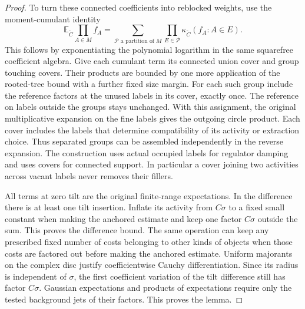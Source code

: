 \documentclass[11pt]{article}
\theoremstyle{definition}
\newcommand{\E}{\mathbb E}
\begin{document}
\begin{proof}
To turn these connected coefficients into reblocked weights,
use the moment-cumulant identity
\begin{equation}
 \E_{\widetilde C}\prod_{A\in M} f_A
     =\sum_{\mathcal P\text{ a partition of }M}
              \prod_{E\in\mathcal P}
                \kappa_{\widetilde C}(f_A:A\in E).
\end{equation}
This follows by exponentiating the polynomial logarithm in
the same squarefree coefficient algebra. Give each cumulant
term its connected union cover and group touching covers.
Their products are bounded by one more application of
the rooted-tree bound with a further fixed size margin.
For each such group include the reference factors at the
unused labels in its cover, exactly once. The reference
on labels outside the groups stays unchanged. With this
assignment, the original multiplicative expansion on
the fine labels gives the outgoing circle product. Each cover
includes the labels that determine compatibility of its
activity or extraction choice. Thus separated groups
can be assembled independently in the reverse expansion.
The construction uses actual occupied labels for regulator
damping and uses covers for connected support. In particular
a cover joining two activities across vacant labels never
removes their fillers.

All terms at zero tilt are the original finite-range
expectations. In the difference there is at least one
tilt insertion. Inflate its activity from \(C\sigma\)
to a fixed small constant when making the anchored
estimate and keep one factor \(C\sigma\) outside the
sum. This proves the difference bound. The same operation
can keep any prescribed fixed number of costs belonging
to other kinds of objects when those costs are factored out
before making the anchored estimate. Uniform majorants on
the complex disc justify coefficientwise Cauchy
differentiation. Since its radius is independent of
\(\sigma\), the first coefficient variation of the tilt
difference still has factor \(C\sigma\). Gaussian
expectations and products of expectations require only
the tested background jets of their factors. This proves
the lemma.
\end{proof}
\end{document}
